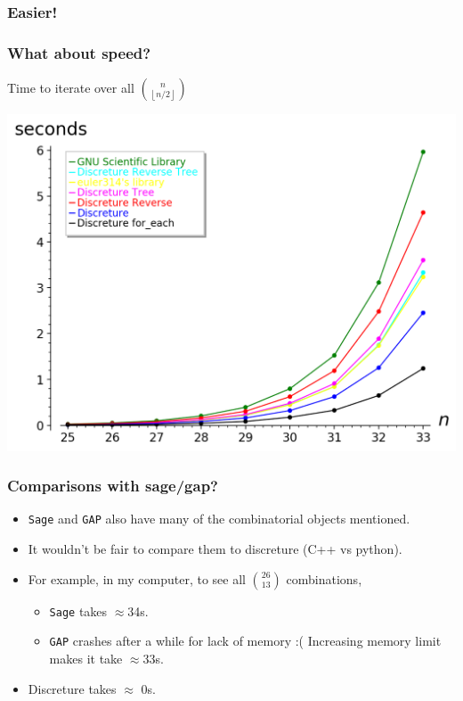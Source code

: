 \documentclass[spanish,professionalfonts]{beamer}
\begin{document}

\begin{frame}\frametitle{Easier!}
  \combsencillodos
  
\end{frame}


\begin{frame}\frametitle{What about speed?}\pause
Time to iterate over all $\binom{n}{\left\lfloor n/2 \right\rfloor}$ \pause
  \begin{center}
    \includegraphics[scale=0.5]{./combvsgsl.png}
  \end{center}
\end{frame}




\begin{frame}\frametitle{Comparisons with sage/gap?}
  \begin{itemize}
    \item \texttt{Sage} and \texttt{GAP} also have many of the combinatorial objects mentioned. \pause
    \item It wouldn't be fair to compare them to discreture (C++ vs python). \pause
    \item For example, in my computer, to see all $\binom{26}{13}$ combinations, \pause
    \begin{itemize}
		\item \texttt{Sage} takes $\approx$34s. \pause
		\item \texttt{GAP} crashes after a while for lack of memory :( \pause Increasing memory limit makes it take $\approx$33s. \pause
    \end{itemize}
    \item Discreture takes $\approx$ 0s.
  \end{itemize}
\end{frame}
\end{document}
